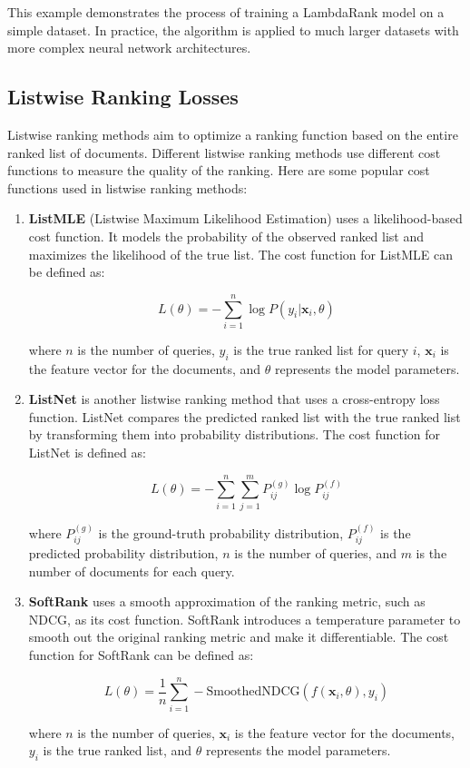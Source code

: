 \documentclass[12pt]{article}
\begin{document}
This example demonstrates the process of training a LambdaRank model on a simple dataset. In practice, the algorithm is applied to much larger datasets with more complex neural network architectures.



\subsection{Listwise Ranking Losses}

Listwise ranking methods aim to optimize a ranking function based on the entire ranked list of documents. Different listwise ranking methods use different cost functions to measure the quality of the ranking. Here are some popular cost functions used in listwise ranking methods:

\begin{enumerate}
\item \textbf{ListMLE} (Listwise Maximum Likelihood Estimation) uses a likelihood-based cost function. It models the probability of the observed ranked list and maximizes the likelihood of the true list. The cost function for ListMLE can be defined as:

\begin{equation}
    L(\theta) = -\sum_{i=1}^{n} \log P(y_i | \mathbf{x}_i, \theta)
\end{equation}

where $n$ is the number of queries, $y_i$ is the true ranked list for query $i$, $\mathbf{x}_i$ is the feature vector for the documents, and $\theta$ represents the model parameters.

\item \textbf{ListNet} is another listwise ranking method that uses a cross-entropy loss function. ListNet compares the predicted ranked list with the true ranked list by transforming them into probability distributions. The cost function for ListNet is defined as:

\begin{equation}
    L(\theta) = -\sum_{i=1}^{n} \sum_{j=1}^{m} P_{ij}^{(g)} \log P_{ij}^{(f)}
\end{equation}

where $P_{ij}^{(g)}$ is the ground-truth probability distribution, $P_{ij}^{(f)}$ is the predicted probability distribution, $n$ is the number of queries, and $m$ is the number of documents for each query.

\item \textbf{SoftRank} uses a smooth approximation of the ranking metric, such as NDCG, as its cost function. SoftRank introduces a temperature parameter to smooth out the original ranking metric and make it differentiable. The cost function for SoftRank can be defined as:

\begin{equation}
    L(\theta) = \frac{1}{n} \sum_{i=1}^{n} -\text{SmoothedNDCG}(f(\mathbf{x}_i, \theta), y_i)
\end{equation}

where $n$ is the number of queries, $\mathbf{x}_i$ is the feature vector for the documents, $y_i$ is the true ranked list, and $\theta$ represents the model parameters.
\end{enumerate}
\end{document}
